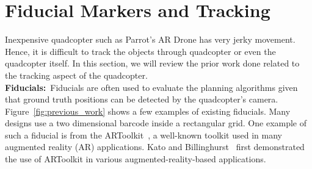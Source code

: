 \section{Fiducial Markers and Tracking}
Inexpensive quadcopter such as Parrot's AR Drone has very jerky movement. Hence,
it is difficult to track the objects through quadcopter or even the quadcopter
itself. In this section, we will review the prior work done related to the
tracking aspect of the quadcopter.\\

\noindent\textbf{Fiducials:}~Fiducials are often used to evaluate the planning
algorithms given that ground truth positions can be detected by the
quadcopter's camera. Figure~\ref{fig:previous_work} shows a few
examples of existing fiducials.  Many designs use a two
dimensional barcode inside a rectangular grid. One example of such a
fiducial is from the ARToolkit~\cite{ARToolkit02}, a well-known
toolkit used in many augmented reality (AR) applications. Kato and
Billinghurst~\cite{kato-artoolkit} first demonstrated the use of
ARToolkit in various augmented-reality-based applications.

